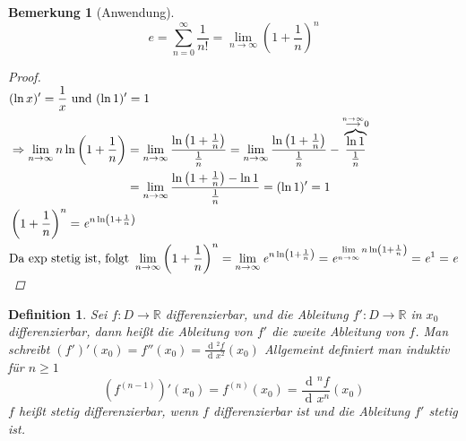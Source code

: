 \documentclass[a4paper,titlepage,oneside]{article}
\def\R{\ensuremath{\mathbb{R}} }
\def\e{\ensuremath{\mathit{e}} }
\newcommand{\der}{\operatorname{d\!}{}}
\newcommand{\suminf}[2][n]{\ensuremath{\sum_{#1= 0}^{\infty}{#2}}}
\renewcommand{\liminf}[2][n]{\ensuremath{\lim\limits_{#1 \rightarrow \infty}{#2}}}
\newcommand{\longtoinf}[1][n]{\ensuremath{\overset{\scriptscriptstyle{#1 \to \infty}}{\longrightarrow}}}
\theoremstyle{thmstyle}
\newtheorem{defi}[satz]{Definition}
\newtheorem{bem}[satz]{Bemerkung}
\theoremstyle{subthmstyle}
\begin{document}
\begin{bem}[Anwendung]
\[\e = \suminf{\frac{1}{n!}} = \liminf{\left( 1 + \frac{1}{n}\right)^n}\]
\begin{proof}
$ \displaystyle \begin{aligned}[t]&(\ln x)'= \frac{1}{x} \text{ und } (\ln 1)' = 1 \\
&\Rightarrow \begin{aligned}[t]\liminf{ n \ln\left(1 + \frac{1}{n}\right)} &= \liminf{\frac{\ln\left(1 + \frac{1}{n}\right)}{\frac{1}{n}}} =  \liminf{\frac{\ln\left(1  + \frac{1}{n}\right)}{\frac{1}{n}} - \overbrace{\frac{\ln 1}{\frac{1}{n}}}^{\longtoinf 0}}\\
&= \liminf{\frac{\ln\left(1  + \frac{1}{n}\right) - \ln 1}{\frac{1}{n}}} = (\ln 1)' = 1\end{aligned}\\
&\left(1  + \frac{1}{n}\right)^n = \e^{n\ln \left(1  + \frac{1}{n}\right)}\\
&\text{Da $\exp$ stetig ist, folgt } \liminf{\left(1  + \frac{1}{n}\right)^n} = \liminf{\e^{n\ln \left(1  + \frac{1}{n}\right)}} = \e^{\liminf{n\ln \left(1  + \frac{1}{n}\right)}} = \e^1 = \e
\end{aligned}\\$
\end{proof}
\end{bem}

\begin{defi}
Sei $f : D \to \R$ differenzierbar, und die Ableitung $f': D \to \R$ in $x_0$ differenzierbar, dann heißt die Ableitung von $f'$ die zweite Ableitung von $f$. Man schreibt $(f')' (x_0) = f''(x_0) = \frac{\der^2 f}{\der x^2 } (x_0)$
Allgemeint definiert man induktiv für $n \ge 1$ \[(f^{(n-1)})' (x_0) = f^{(n)}(x_0) = \frac{\der^n f}{\der x^n } (x_0)\]
$f$ heißt stetig differenzierbar, wenn $f$ differenzierbar ist und die Ableitung $f'$ stetig ist.
\end{defi}
\end{document}
